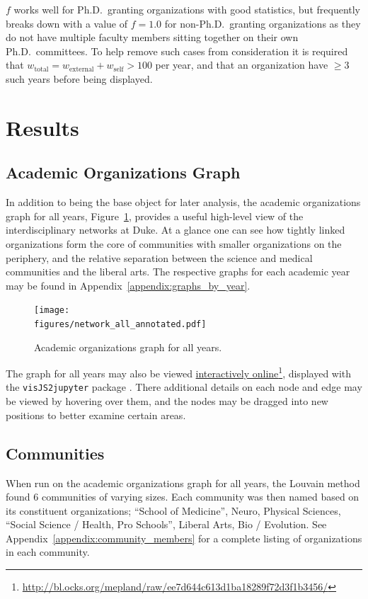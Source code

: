 \documentclass[notitlepage,aps,prd,nofootinbib]{revtex4-1}
\newcommand{\figures}{../outputs/plots}
\begin{document}
$f$ works well for Ph.D.\ granting organizations with good statistics, but frequently breaks down with a value of $f=1.0$ for non-Ph.D.\ granting organizations as they do not have multiple faculty members sitting together on their own Ph.D.\ committees. To help remove such cases from consideration it is required that $w_{\text{total}} = w_{\text{external}} + w_{\text{self}} > 100$ per year, and that an organization have $\geq 3$ such years before being displayed.


\section{Results}
\subsection{Academic Organizations Graph}

In addition to being the base object for later analysis, the academic organizations graph for all years, Figure~\ref{fig:graph_all_years}, provides a useful high-level view of the interdisciplinary networks at Duke. At a glance one can see how tightly linked organizations form the core of communities with smaller organizations on the periphery, and the relative separation between the science and medical communities and the liberal arts. The respective graphs for each academic year may be found in Appendix~\ref{appendix:graphs_by_year}.

\begin{figure}[!htb]\centering
  \texttt{[image: \\figures/network\_all\_annotated.pdf]}
  \caption{Academic organizations graph for all years.}
  \label{fig:graph_all_years}
\end{figure}

The graph for all years may also be viewed \href{TODO}{interactively online}\footnote{\url{http://bl.ocks.org/mepland/raw/ee7d644c613d1ba18289f72d3f1b3456/}}, displayed with the \texttt{visJS2jupyter} package \cite{visJS2jupyter}. There additional details on each node and edge may be viewed by hovering over them, and the nodes may be dragged into new positions to better examine certain areas.

\subsection{Communities}
When run on the academic organizations graph for all years, the Louvain method found 6 communities of varying sizes. Each community was then named based on its constituent organizations; ``School of Medicine'', Neuro, Physical Sciences, ``Social Science / Health, Pro Schools'', Liberal Arts, Bio / Evolution. See Appendix~\ref{appendix:community_members} for a complete listing of organizations in each community.
\end{document}
